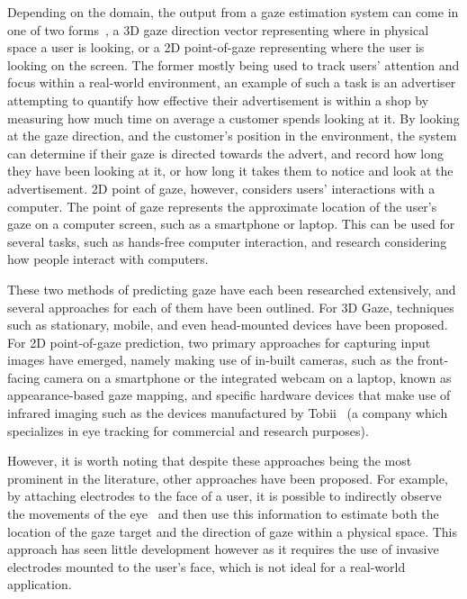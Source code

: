 \documentclass{report}
\begin{document}
Depending on the domain, the output from a gaze estimation system can come in one of two forms~\cite{liu2022in}, a 3D gaze direction vector representing where in physical space a user is looking, or a 2D point-of-gaze representing where the user is looking on the screen. The former mostly being used to track users' attention and focus within a real-world environment, an example of such a task is an advertiser attempting to quantify how effective their advertisement is within a shop by measuring how much time on average a customer spends looking at it. By looking at the gaze direction, and the customer's position in the environment, the system can determine if their gaze is directed towards the advert, and record how long they have been looking at it, or how long it takes them to notice and look at the advertisement. 2D point of gaze, however, considers users' interactions with a computer. The point of gaze represents the approximate location of the user's gaze on a computer screen, such as a smartphone or laptop. This can be used for several tasks, such as hands-free computer interaction, and research considering how people interact with computers. 

These two methods of predicting gaze have each been researched extensively, and several approaches for each of them have been outlined. For 3D Gaze, techniques such as stationary, mobile, and even head-mounted devices have been proposed. For 2D point-of-gaze prediction, two primary approaches for capturing input images have emerged, namely making use of in-built cameras, such as the front-facing camera on a smartphone or the integrated webcam on a laptop, known as appearance-based gaze mapping, and specific hardware devices that make use of infrared imaging such as the devices manufactured by Tobii~\cite{tobiiprofusion} (a company which specializes in eye tracking for commercial and research purposes). 

However, it is worth noting that despite these approaches being the most prominent in the literature, other approaches have been proposed. For example, by attaching electrodes to the face of a user, it is possible to indirectly observe the movements of the eye~\cite{young1975survey} and then use this information to estimate both the location of the gaze target and the direction of gaze within a physical space. This approach has seen little development however as it requires the use of invasive electrodes mounted to the user's face, which is not ideal for a real-world application. 
\end{document}
